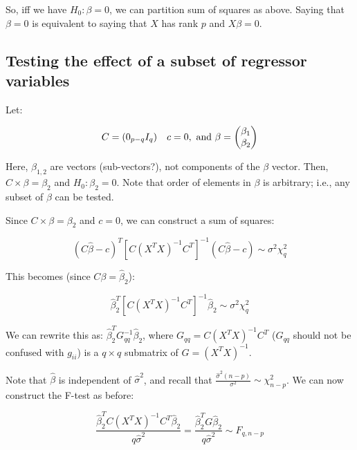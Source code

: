 So, iff we have $H_0: \beta=0$, we can partition sum of squares as above. Saying that $\beta=0$ is equivalent to saying that $X$ has rank $p$ and $X\beta=0$.

\subsection{Testing the effect of a subset of regressor variables}

Let:

\begin{equation}
C= (0_{p-q} I_q) \quad c=0, \hbox{ and } \beta=\begin{pmatrix} \beta_1\\ \beta_2 \end{pmatrix}
\end{equation}


Here, $\beta_{1,2}$ are vectors (sub-vectors?), not components of the $\beta$ vector.
Then, $C\times \beta = \beta_2$ and $H_0: \beta_2=0$. Note that order of elements in $\beta$ is arbitrary; i.e., any subset of $\beta$ can be tested.

Since  $C\times \beta = \beta_2$ and $c=0$, we can construct a sum of squares:

\begin{equation}
(C\hat{\beta} - c)^T [C (X^T X)^{-1} C^T]^{-1} (C\hat{\beta} - c) \sim \sigma^2 \chi_q^2
\end{equation}

This becomes (since $C\beta=\hat{\beta}_2$):

\begin{equation}
\hat{\beta}_2^T [C (X^T X)^{-1} C^T]^{-1} \hat{\beta}_2 \sim \sigma^2 \chi_q^2
\end{equation}

We can rewrite this as: $\hat{\beta}_2^T G_{qq}^{-1} \hat{\beta}_2$, where $G_{qq}= C (X^T X)^{-1} C^T$ ($G_{qq}$ should not be confused with $g_{ii}$) is a $q\times q$ submatrix of $G=(X^T X)^{-1}$. 

Note that $\hat{\beta}$ is independent of $\hat{\sigma}^2$, and 
recall that  $\frac{\hat{\sigma}^2 (n-p)}{\sigma^2} \sim \chi_{n-p}^2$. We can now construct the F-test as before:

\begin{equation}
\frac{\hat{\beta}_2^T C (X^T X)^{-1} C^T \hat{\beta}_2}{q\hat{\sigma}^2} = 
\frac{\hat{\beta}_2^T G \hat{\beta}_2}{q\hat{\sigma}^2}
 \sim F_{q,n-p}
\end{equation}


